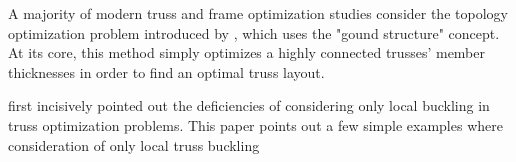 \documentclass{report}
\begin{document}
A majority of modern truss and frame optimization studies consider the topology
optimization problem introduced by \cite{}, which uses the "gound structure" concept.
At its core, this method simply optimizes a highly connected trusses' member thicknesses
in order to find an optimal truss layout.

\cite{zhaoa} first incisively pointed out the deficiencies of considering only
local buckling in truss optimization problems. This paper points out a few simple
examples where consideration of only local truss buckling 
\end{document}
